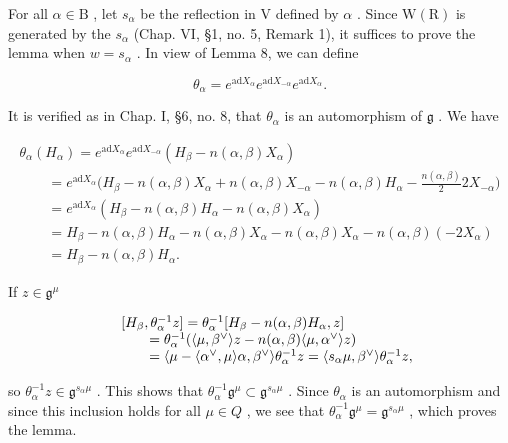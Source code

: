 For all \(\alpha \in \mathrm{B}\) , let \(s_{\alpha}\) be the reflection in V defined by \(\alpha\) . Since \(\mathrm{W}(\mathrm{R})\) is generated by the \(s_{\alpha}\) (Chap. VI, §1, no. 5, Remark 1), it suffices to prove the lemma when \(w = s_{\alpha}\) . In view of Lemma 8, we can define

\[
\theta_ {\alpha} = e ^ {\mathrm{ad} X _ {\alpha}} e ^ {\mathrm{ad} X _ {- \alpha}} e ^ {\mathrm{ad} X _ {\alpha}}.
\]

It is verified as in Chap. I, §6, no. 8, that \(\theta_{\alpha}\) is an automorphism of \(\mathfrak{g}\) . We have

\[
\begin{array}{l} \theta_ {\alpha} (H _ {\alpha}) = e ^ {\mathrm{ad} X _ {\alpha}} e ^ {\mathrm{ad} X _ {- \alpha}} (H _ {\beta} - n (\alpha , \beta) X _ {\alpha}) \\ \qquad = e ^ {\mathrm{ad} X _ {\alpha}} \bigg (H _ {\beta} - n (\alpha , \beta) X _ {\alpha} + n (\alpha , \beta) X _ {- \alpha} - n (\alpha , \beta) H _ {\alpha} - \frac {n (\alpha , \beta)}{2} 2 X _ {- \alpha} \bigg) \\ \qquad = e ^ {\mathrm{ad} X _ {\alpha}} \left(H _ {\beta} - n (\alpha , \beta) H _ {\alpha} - n (\alpha , \beta) X _ {\alpha}\right) \\ \qquad = H _ {\beta} - n (\alpha , \beta) H _ {\alpha} - n (\alpha , \beta) X _ {\alpha} - n (\alpha , \beta) X _ {\alpha} - n (\alpha , \beta) (- 2 X _ {\alpha}) \\ \qquad = H _ {\beta} - n (\alpha , \beta) H _ {\alpha}. \end{array}
\]

If \(z\in \mathfrak{g}^{\mu}\)

\[
\begin{array}{r l} & {[ H _ {\beta}, \theta_ {\alpha} ^ {- 1} z ] = \theta_ {\alpha} ^ {- 1} [ H _ {\beta} - n (\alpha , \beta) H _ {\alpha}, z ]} \\ & {\qquad = \theta_ {\alpha} ^ {- 1} (\langle \mu , \beta^ {\vee} \rangle z - n (\alpha , \beta) \langle \mu , \alpha^ {\vee} \rangle z)} \\ & {\qquad = \langle \mu - \langle \alpha^ {\vee}, \mu \rangle \alpha , \beta^ {\vee} \rangle \theta_ {\alpha} ^ {- 1} z = \langle s _ {\alpha} \mu , \beta^ {\vee} \rangle \theta_ {\alpha} ^ {- 1} z,} \end{array}
\]

so \(\theta_{\alpha}^{-1}z\in\mathfrak{g}^{s_{\alpha}\mu}\) . This shows that \(\theta_{\alpha}^{-1}\mathfrak{g}^{\mu}\subset\mathfrak{g}^{s_{\alpha}\mu}\) . Since \(\theta_{\alpha}\) is an automorphism and since this inclusion holds for all \(\mu\in Q\) , we see that \(\theta_{\alpha}^{-1}\mathfrak{g}^{\mu}=\mathfrak{g}^{s_{\alpha}\mu}\) , which proves the lemma.

